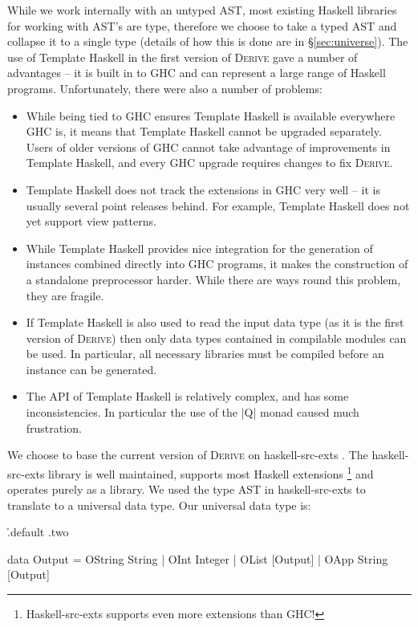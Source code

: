 \documentclass[preprint,draft]{sigplanconf}
\newcommand{\derive}{\textsc{Derive}}
\begin{document}
While we work internally with an untyped AST, most existing Haskell libraries for working with AST's are type, therefore we choose to take a typed AST and collapse it to a single type (details of how this is done are in \S\ref{sec:universe}). The use of Template Haskell in the first version of \derive{} gave a number of advantages -- it is built in to GHC and can represent a large range of Haskell programs. Unfortunately, there were also a number of problems:

\begin{itemize}
\item While being tied to GHC ensures Template Haskell is available everywhere GHC is, it means that Template Haskell cannot be upgraded separately. Users of older versions of GHC cannot take advantage of improvements in Template Haskell, and every GHC upgrade requires changes to fix \derive{}.
\item Template Haskell does not track the extensions in GHC very well -- it is usually several point releases behind. For example, Template Haskell does not yet support view patterns.
\item While Template Haskell provides nice integration for the generation of instances combined directly into GHC programs, it makes the construction of a standalone preprocessor harder. While there are ways round this problem, they are fragile.
\item If Template Haskell is also used to read the input data type (as it is the first version of \derive{}) then only data types contained in compilable modules can be used. In particular, all necessary libraries must be compiled before an instance can be generated.
\item The API of Template Haskell is relatively complex, and has some inconsistencies. In particular the use of the |Q| monad caused much frustration.
\end{itemize}

We choose to base the current version of \derive{} on haskell-src-exts \cite{haskell_src_exts}. The haskell-src-exts library is well maintained, supports most Haskell extensions \footnote{Haskell-src-exts supports even more extensions than GHC!} and operates purely as a library. We used the type AST in haskell-src-exts to translate to a universal data type. Our universal data type is:

\h{.default .two}\begin{code}
data Output  =  OString String
             |  OInt Integer
             |  OList [Output]
             |  OApp String [Output]
\end{code}
\end{document}
